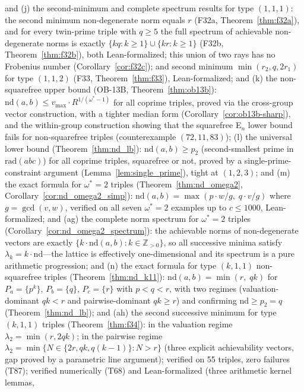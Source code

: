 \documentclass[12pt]{article}
\theoremstyle{definition}
\begin{document}
and (j) the second-minimum and complete spectrum results for type $(1,1,1)$: the
second minimum non-degenerate norm equals $r$ (F32a, Theorem~\ref{thm:f32a}),
and for every twin-prime triple with $q \ge 5$ the full spectrum of achievable
non-degenerate norms is exactly $\{kq:k\ge 1\} \cup \{kr:k\ge 1\}$
(F32b, Theorem~\ref{thm:f32b}), both Lean-formalized; this union of two rays has
no Frobenius number (Corollary~\ref{cor:f32c}); and second minimum
$\min(r_2,q,2r_1)$ for type $(1,1,2)$ (F33, Theorem~\ref{thm:f33}), Lean-formalized;
and (k) the non-squarefree upper bound (OB-13B, Theorem~\ref{thm:ob13b}):
$\mathrm{nd}(a,b) \le v_{\max} \cdot R^{1/(\omega^*-1)}$ for all coprime triples,
proved via the cross-group vector construction, with a tighter median form
(Corollary~\ref{cor:ob13b-sharp}), and the within-group construction showing that the
squarefree E$_n$ lower bound fails for non-squarefree triples
(counterexample $(72,11,83)$); (l) the universal lower bound (Theorem~\ref{thm:nd_lb}):
$\mathrm{nd}(a,b) \ge p_2$ (second-smallest prime in $\mathrm{rad}(abc)$) for all coprime
triples, squarefree or not, proved by a single-prime-constraint argument
(Lemma~\ref{lem:single_prime}), tight at $(1,2,3)$; and (m) the exact formula for
$\omega^*=2$ triples (Theorem~\ref{thm:nd_omega2},
Corollary~\ref{cor:nd_omega2_simp}):
$\mathrm{nd}(a,b) = \max(p\cdot w/g,\; q\cdot v/g)$ where $g = \gcd(v,w)$,
verified on all seven $\omega^*=2$ examples up to $c \le 1000$, Lean-formalized;
and (ag) the complete norm spectrum for $\omega^*=2$ triples
(Corollary~\ref{cor:nd_omega2_spectrum}): the achievable norms of non-degenerate
vectors are exactly $\{k \cdot \mathrm{nd}(a,b) : k \in \mathbb{Z}_{>0}\}$, so all
successive minima satisfy $\lambda_k = k \cdot \mathrm{nd}$---the lattice is
effectively one-dimensional and its spectrum is a pure arithmetic progression;
and (n) the exact formula for type $(k,1,1)$ non-squarefree triples
(Theorem~\ref{thm:nd_k11}): $\mathrm{nd}(a,b) = \min(r,\; qk)$ for
$P_a=\{p^k\}$, $P_b=\{q\}$, $P_c=\{r\}$ with $p<q<r$, with two regimes
(valuation-dominant $qk<r$ and pairwise-dominant $qk \ge r$) and
confirming $\mathrm{nd} \ge p_2 = q$ (Theorem~\ref{thm:nd_lb});
and (ah) the second successive minimum for type $(k,1,1)$ triples
(Theorem~\ref{thm:f34}):
in the valuation regime $\lambda_2 = \min(r, 2qk)$;
in the pairwise regime $\lambda_2 = \min\{N \in \{2r, qk, q(k-1)\} : N > r\}$
(three explicit achievability vectors, gap proved by a parametric line argument);
verified on 55 triples, zero failures (T87);
verified numerically (T68) and Lean-formalized (three arithmetic kernel lemmas,
\end{document}
